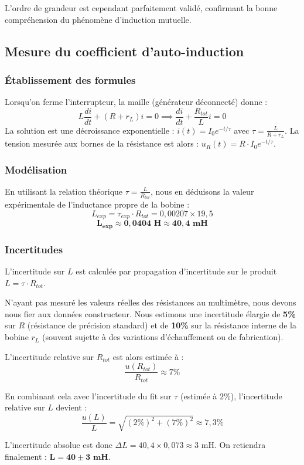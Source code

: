\documentclass[a4paper,9pt,french]{scrartcl}
\begin{document}
L'ordre de grandeur est cependant parfaitement validé, confirmant la bonne compréhension du phénomène d'induction mutuelle.
\subsection{Mesure du coeﬃcient d'auto-induction}
\subsubsection{Établissement des formules}
Lorsqu'on ferme l'interrupteur, la maille (générateur déconnecté) donne :
$$L\frac{di}{dt} + (R + r_L)i = 0 \implies \frac{di}{dt} + \frac{R_{tot}}{L}i = 0$$
La solution est une décroissance exponentielle : $i(t) = I_0 e^{-t/\tau}$ avec $\tau = \frac{L}{R+r_L}$.
La tension mesurée aux bornes de la résistance est alors : $u_R(t) = R \cdot I_0 e^{-t/\tau}$.

\subsubsection{Modélisation}


En utilisant la relation théorique $\tau = \frac{L}{R_{tot}}$, nous en déduisons la valeur expérimentale de l'inductance propre de la bobine :
    $$L_{exp} = \tau_{exp} \cdot R_{tot} = 0,00207 \times 19,5$$
    $$\mathbf{L_{exp} \approx 0,0404 \text{ H} \approx 40,4 \text{ mH}}$$

\subsubsection{Incertitudes}
L'incertitude sur $L$ est calculée par propagation d'incertitude sur le produit $L = \tau \cdot R_{tot}$. 

N'ayant pas mesuré les valeurs réelles des résistances au multimètre, nous devons nous fier aux données constructeur. Nous estimons une incertitude élargie de \textbf{5\%} sur $R$ (résistance de précision standard) et de \textbf{10\%} sur la résistance interne de la bobine $r_L$ (souvent sujette à des variations d'échauffement ou de fabrication). 

L'incertitude relative sur $R_{tot}$ est alors estimée à :
$$\frac{u(R_{tot})}{R_{tot}} \approx 7\%$$

En combinant cela avec l'incertitude du fit sur $\tau$ (estimée à $2\%$), l'incertitude relative sur $L$ devient :
$$\frac{u(L)}{L} = \sqrt{(2\%)^2 + (7\%)^2} \approx 7,3\%$$

L'incertitude absolue est donc $\Delta L = 40,4 \times 0,073 \approx 3 \text{ mH}$.
On retiendra finalement : $\mathbf{L = 40 \pm 3 \text{ mH}}$.
\end{document}
